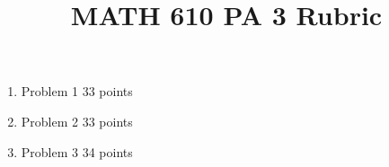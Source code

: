 \documentclass{article}
\title{MATH 610 PA 3 Rubric}
\author{}
\date{}
\begin{document}
\maketitle

\begin{enumerate}
	\item Problem 1 33 points
	\item Problem 2 33 points
	\item Problem 3 34 points
\end{enumerate}
\end{document}
